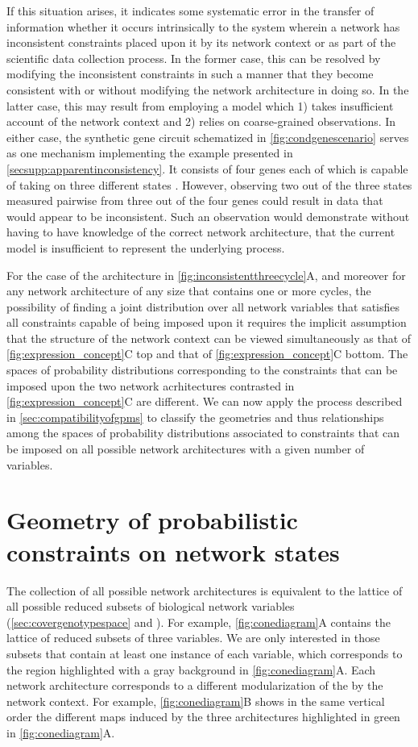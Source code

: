 If this situation arises, it indicates some systematic error in the transfer of information whether it occurs intrinsically to the system wherein a network has inconsistent constraints placed upon it by its network context or as part of the scientific data collection process. In the former case, this can be resolved by modifying the inconsistent constraints in such a manner that they become consistent with or without modifying the network architecture in doing so. In the latter case, this may result from employing a model which 1) takes insufficient account of the network context and 2) relies on coarse-grained observations. In either case, the synthetic gene circuit schematized in \ref{fig:condgenescenario} serves as one mechanism implementing the example presented in  \ref{secsupp:apparentinconsistency}. It consists of four genes each of which is capable of taking on three different states \cite{Rieckh2013a}. However, observing two out of the three states measured pairwise from three out of the four genes could result in data that would appear to be inconsistent. Such an observation would demonstrate without having to have knowledge of the correct network architecture, that the current model is insufficient to represent the underlying process.

For the case of the architecture in \ref{fig:inconsistentthreecycle}A, and moreover for any network architecture of any size that contains one or more cycles, the possibility of finding a joint distribution over all network variables that satisfies all constraints capable of being imposed upon it requires the implicit assumption that the structure of the network context can be viewed simultaneously as that of \ref{fig:expression_concept}C top and that of \ref{fig:expression_concept}C bottom. The spaces of probability distributions corresponding to the constraints that can be imposed upon the two network acrhitectures contrasted in \ref{fig:expression_concept}C are different. We can now apply the process described in \ref{sec:compatibilityofgpms} to classify the geometries and thus relationships among the spaces of probability distributions associated to constraints that can be imposed on all possible network architectures with a given number of variables.

\section{Geometry of probabilistic constraints on network states}\label{sec:probconstrgeometry}
The collection of all possible network architectures is equivalent to the lattice of all possible reduced subsets of biological network variables (\ref{sec:covergenotypespace} and ). For example, \ref{fig:conediagram}A contains the lattice of reduced subsets of three variables. We are only interested in those subsets that contain at least one instance of each variable, which corresponds to the region highlighted with a gray background in \ref{fig:conediagram}A. Each network architecture corresponds to a different modularization of the \gnpm{} by the network context. For example, \ref{fig:conediagram}B shows in the same vertical order the different maps induced by the three architectures highlighted in green in \ref{fig:conediagram}A.

